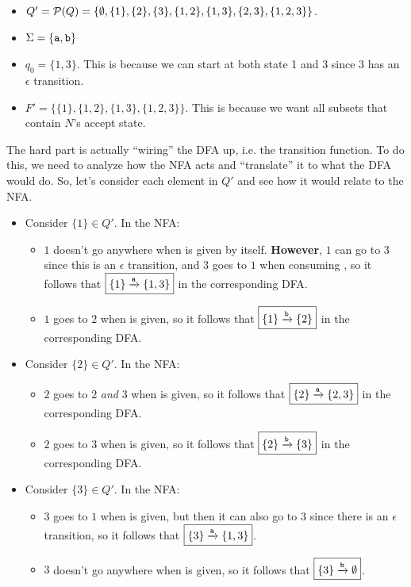 \documentclass[letterpaper]{article}
\begin{document}
\begin{itemize}
    \item $Q' = \mathcal{P}(Q) = \{\emptyset, \{1\}, \{2\}, \{3\}, \{1, 2\}, \{1, 3\}, \{2, 3\}, \{1, 2, 3\}\}$. 
    \item $\Sigma = \{\texttt{a}, \texttt{b}\}$
    \item $q_0 = \{1, 3\}$. This is because we can start at both state 1 and 3 since 3 has an $\epsilon$ transition.
    \item $F' = \{\{1\}, \{1, 2\}, \{1, 3\}, \{1, 2, 3\}\}$. This is because we want all subsets that contain $N$'s accept state. 
\end{itemize}
The hard part is actually ``wiring'' the DFA up, i.e. the transition function. To do this, we need to analyze how the NFA acts and ``translate'' it to what the DFA would do. So, let's consider each element in $Q'$ and see how it would relate to the NFA. 
\begin{itemize}
    \item Consider $\{1\} \in Q'$. In the NFA:
    \begin{itemize}
        \item $1$ doesn't go anywhere when  is given by itself. \textbf{However}, $1$ can go to $3$ since this is an $\epsilon$ transition, and $3$ goes to $1$ when consuming , so it follows that $\boxed{\{1\} \xrightarrow{\texttt{a}} \{1, 3\}}$ in the corresponding DFA. 
        \item $1$ goes to $2$ when  is given, so it follows that $\boxed{\{1\} \xrightarrow[]{\texttt{b}} \{2\}}$ in the corresponding DFA. 
    \end{itemize}
    \item Consider $\{2\} \in Q'$. In the NFA: 
    \begin{itemize}
        \item $2$ goes to $2$ \emph{and} $3$ when  is given, so it follows that $\boxed{\{2\} \xrightarrow{\texttt{a}} \{2, 3\}}$ in the corresponding DFA. 
        \item $2$ goes to $3$ when  is given, so it follows that $\boxed{\{2\} \xrightarrow[]{\texttt{b}} \{3\}}$ in the corresponding DFA. 
    \end{itemize}
    \item Consider $\{3\} \in Q'$. In the NFA: 
    \begin{itemize}
        \item $3$ goes to $1$ when  is given, but then it can also go to $3$ since there is an $\epsilon$ transition, so it follows that $\boxed{\{3\} \xrightarrow{\texttt{a}} \{1, 3\}}$. 
        \item $3$ doesn't go anywhere when  is given, so it follows that $\boxed{\{3\} \xrightarrow{\texttt{b}} \emptyset}$.
    \end{itemize}
\end{itemize}
\end{document}
